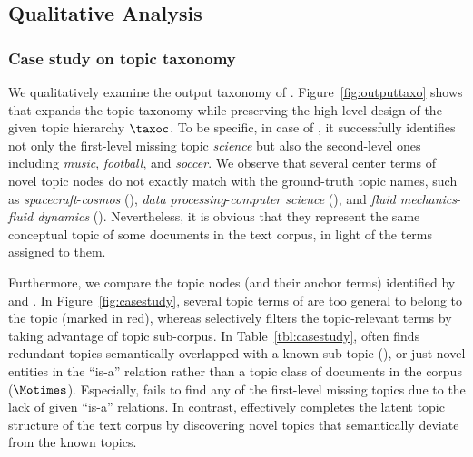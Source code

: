 \subsection{Qualitative Analysis}
\label{subsec:qualanal}
\subsubsection{Case study on topic taxonomy}
\label{subsubsec:casestudy}
We qualitatively examine the output taxonomy of \proposed.
Figure~\ref{fig:outputtaxo} shows that \proposed expands the topic taxonomy while preserving the high-level design of the given topic hierarchy $\taxoc$.
To be specific, in case of \nyt, it successfully identifies not only the first-level missing topic \textit{science} but also the second-level ones including \textit{music}, \textit{football}, and \textit{soccer}.
We observe that several center terms of novel topic nodes do not exactly match with the ground-truth topic names, such as \textit{spacecraft}-\textit{cosmos} (\nyt), \textit{data processing}-\textit{computer science} (\arxiv), and \textit{fluid mechanics}-\textit{fluid dynamics} (\arxiv).
Nevertheless, it is obvious that they represent the same conceptual topic of some documents in the text corpus, in light of the terms assigned to them.

Furthermore, we compare the topic nodes (and their anchor terms) identified by \proposed and \corel.
In Figure~\ref{fig:casestudy}, several topic terms of \corel are too general to belong to the topic (marked in red), whereas \proposed selectively filters the topic-relevant terms by taking advantage of topic sub-corpus.
In Table~\ref{tbl:casestudy}, \corel often finds redundant topics semantically overlapped with a known sub-topic (), or just novel entities in the ``is-a'' relation rather than a topic class of documents in the corpus ($\Motimes$).
Especially, \corel fails to find any of the first-level missing topics due to the lack of given ``is-a'' relations.
In contrast, \proposed effectively completes the latent topic structure of the text corpus by discovering novel topics that semantically deviate from the known topics.



